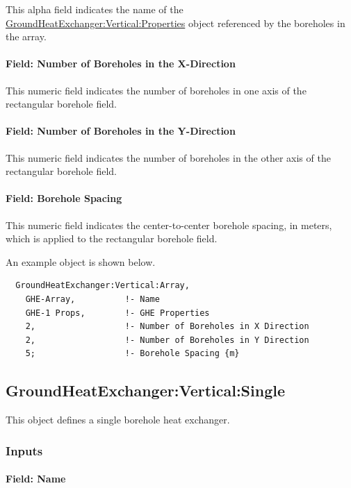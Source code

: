 This alpha field indicates the name of the \hyperref[groundheatexchangerverticalproperties]{GroundHeatExchanger:Vertical:Properties} object referenced by the boreholes in the array.

\paragraph{Field: Number of Boreholes in the X-Direction}

This numeric field indicates the number of boreholes in one axis of the rectangular borehole field.

\paragraph{Field: Number of Boreholes in the Y-Direction}

This numeric field indicates the number of boreholes in the other axis of the rectangular borehole field.

\paragraph{Field: Borehole Spacing}

This numeric field indicates the center-to-center borehole spacing, in meters, which is applied to the rectangular borehole field.

An example object is shown below.

\begin{lstlisting}
  GroundHeatExchanger:Vertical:Array,
    GHE-Array,          !- Name
    GHE-1 Props,        !- GHE Properties
    2,                  !- Number of Boreholes in X Direction
    2,                  !- Number of Boreholes in Y Direction
    5;                  !- Borehole Spacing {m}
\end{lstlisting}

\subsection{GroundHeatExchanger:Vertical:Single}\label{groundheatexchangerverticalsingle}

This object defines a single borehole heat exchanger.

\subsubsection{Inputs}

\paragraph{Field: Name}

